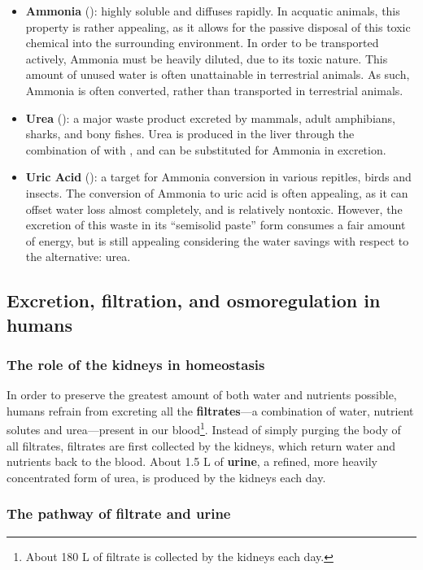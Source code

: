 \documentclass{article}
\begin{document}
\begin{itemize}
	\item \textbf{Ammonia} (): highly soluble and diffuses rapidly. In
		acquatic animals, this property is rather appealing, as it allows for
		the passive disposal of this toxic chemical into the surrounding
		environment. In order to be transported actively, Ammonia must be
		heavily diluted, due to its toxic nature. This amount of unused water
		is often unattainable in terrestrial animals. As such, Ammonia is often
		converted, rather than transported in terrestrial animals.
	\item \textbf{Urea} (): a major waste product excreted by mammals,
		adult amphibians, sharks, and bony fishes. Urea is produced in the liver
		through the combination of  with , and can be
		substituted for Ammonia in excretion.
	\item \textbf{Uric Acid} (): a target for Ammonia conversion
		in various repitles, birds and insects. The conversion of Ammonia to
		uric acid is often appealing, as it can offset water loss almost
		completely, and is relatively nontoxic. However, the excretion of this
		waste in its ``semisolid paste'' form consumes a fair amount of energy,
		but is still appealing considering the water savings with respect to
		the alternative: urea.
\end{itemize}

\subsection{Excretion, filtration, and osmoregulation in humans}

\subsubsection{The role of the kidneys in homeostasis}

In order to preserve the greatest amount of both water and nutrients possible,
humans refrain from excreting all the \textbf{filtrates}---a combination of
water, nutrient solutes and urea---present in our blood\footnote{About 180 L of
filtrate is collected by the kidneys each day.}. Instead of simply purging the
body of all filtrates, filtrates are first collected by the kidneys, which
return water and nutrients back to the blood. About 1.5 L of \textbf{urine},
a refined, more heavily concentrated form of urea, is produced by the kidneys
each day.

\subsubsection{The pathway of filtrate and urine}
\end{document}
